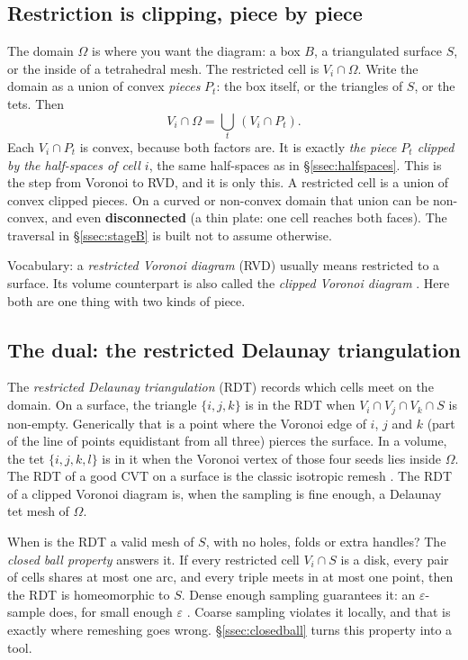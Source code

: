 \documentclass[11pt,a4paper]{article}
\newcommand{\secref}[1]{\S\ref{#1}}
\newcommand{\Secref}[1]{\S\ref{#1}}          %
\begin{document}
\subsection{Restriction is clipping, piece by piece}\label{ssec:restriction}

The domain $\Omega$ is where you want the diagram: a box $B$, a triangulated surface $S$, or the
inside of a tetrahedral mesh. The restricted cell is $V_i \cap \Omega$. Write the domain as a
union of convex \emph{pieces} $P_t$: the box itself, or the triangles of $S$, or the tets. Then
\[
  V_i \cap \Omega = \bigcup_t \, (V_i \cap P_t).
\]
Each $V_i \cap P_t$ is convex, because both factors are. It is exactly \emph{the piece $P_t$
clipped by the half-spaces of cell $i$}, the same half-spaces as in \secref{ssec:halfspaces}.
This is the step from Voronoi to RVD, and it is only this. A restricted cell is a union of convex
clipped pieces. On a curved or non-convex domain that union can be non-convex, and even
\textbf{disconnected} (a thin plate: one cell reaches both faces). The traversal in
\secref{ssec:stageB} is built not to assume otherwise.

Vocabulary: a \emph{restricted Voronoi diagram} (RVD) usually means restricted to a surface.
Its volume counterpart is also called the \emph{clipped Voronoi diagram} \citep{yan2013}. Here
both are one thing with two kinds of piece.

\subsection{The dual: the restricted Delaunay triangulation}\label{ssec:rdt}

The \emph{restricted Delaunay triangulation} (RDT) records which cells meet on the domain. On a
surface, the triangle $\{i,j,k\}$ is in the RDT when $V_i \cap V_j \cap V_k \cap S$ is non-empty.
Generically that is a point where the Voronoi edge of $i$, $j$ and $k$ (part of the line of
points equidistant from all three) pierces the surface. In a volume, the tet $\{i,j,k,l\}$ is in
it when the Voronoi vertex of those four seeds lies inside $\Omega$. The RDT of a good CVT on a
surface is the classic isotropic remesh \citep{yan2009}. The RDT of a clipped Voronoi diagram
is, when the sampling is fine enough, a Delaunay tet mesh of $\Omega$.

When is the RDT a valid mesh of $S$, with no holes, folds or extra handles? The \emph{closed ball
property} \citep{edelsbrunner1997} answers it. If every restricted cell $V_i \cap S$ is a disk,
every pair of cells shares at most one arc, and every triple meets in at most one point, then the
RDT is homeomorphic to $S$. Dense enough sampling guarantees it: an $\varepsilon$-sample does,
for small enough $\varepsilon$ \citep{amenta1999}. Coarse sampling violates it locally, and that is exactly where remeshing goes
wrong. \Secref{ssec:closedball} turns this property into a tool.
\end{document}

